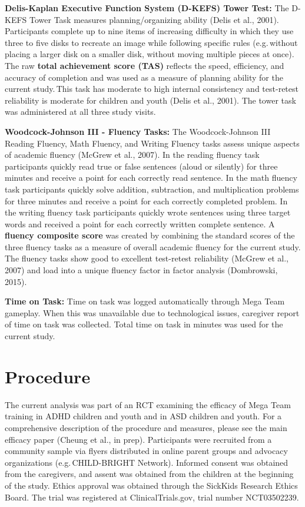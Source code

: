 \documentclass[
  letterpaper,
]{ut-thesis}
\begin{document}
\textbf{Delis-Kaplan Executive Function System (D-KEFS) Tower Test:} The
D-KEFS Tower Task measures planning/organizing ability (Delis et al.,
2001). Participants complete up to nine items of increasing difficulty
in which they use three to five disks to recreate an image while
following specific rules (e.g.\,without placing a larger disk on a
smaller disk, without moving multiple pieces at once). The raw
\textbf{total achievement score (TAS)} reflects the speed, efficiency,
and accuracy of completion and was used as a measure of planning ability
for the current study.\,This task has moderate to high internal
consistency and test-retest reliability is moderate for children and
youth (Delis et al., 2001). The tower task was administered at all three
study visits.

\textbf{Woodcock-Johnson III - Fluency Tasks:} The Woodcock-Johnson III
Reading Fluency, Math Fluency, and Writing Fluency tasks assess unique
aspects of academic fluency (McGrew et al., 2007). In the reading
fluency task participants quickly read true or false sentences (aloud or
silently) for three minutes and receive a point for each correctly read
sentence. In the math fluency task participants quickly solve addition,
subtraction, and multiplication problems for three minutes and receive a
point for each correctly completed problem. In the writing fluency task
participants quickly wrote sentences using three target words and
received a point for each correctly written complete sentence. A
\textbf{fluency composite score} was created by combining the standard
scores of the three fluency tasks as a measure of overall academic
fluency for the current study. The fluency tasks show good to excellent
test-retest reliability (McGrew et al., 2007) and load into a unique
fluency factor in factor analysis (Dombrowski, 2015).

\textbf{Time on Task:} Time on task was logged automatically through
Mega Team gameplay. When this was unavailable due to technological
issues, caregiver report of time on task was collected. Total time on
task in minutes was used for the current study.

\section{Procedure}\label{procedure}

The current analysis was part of an RCT examining the efficacy of Mega
Team training in ADHD children and youth and in ASD children and youth.
For a comprehensive description of the procedure and measures, please
see the main efficacy paper (Cheung et al., in prep). Participants were
recruited from a community sample via flyers distributed in online
parent groups and advocacy organizations (e.g.\,CHILD-BRIGHT Network).
Informed consent was obtained from the caregivers, and assent was
obtained from the children at the beginning of the study. Ethics
approval was obtained through the SickKids Research Ethics Board. The
trial was registered at ClinicalTrials.gov, trial number NCT03502239.
\end{document}
